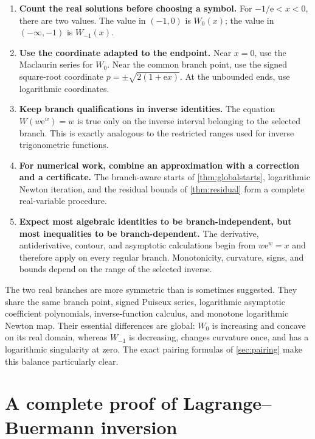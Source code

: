 \documentclass[11pt]{article}
\theoremstyle{remark}
\newcommand{\ee}{\mathrm e}
\begin{document}
\begin{enumerate}[label=\textbf{Step \arabic*.},leftmargin=*]
\item \textbf{Count the real solutions before choosing a symbol.}
For \(-1/\ee<x<0\), there are two values.  The value in \((-1,0)\) is
\(W_0(x)\); the value in \(( -\infty,-1)\) is \(W_{-1}(x)\).

\item \textbf{Use the coordinate adapted to the endpoint.}
Near \(x=0\), use the Maclaurin series for \(W_0\).  Near the common branch
point, use the signed square-root coordinate
\(p=\pm\sqrt{2(1+\ee x)}\).  At the unbounded ends, use logarithmic
coordinates.

\item \textbf{Keep branch qualifications in inverse identities.}
The equation \(W(w\ee^w)=w\) is true only on the inverse interval belonging
to the selected branch.  This is exactly analogous to the restricted ranges
used for inverse trigonometric functions.

\item \textbf{For numerical work, combine an approximation with a
correction and a certificate.}
The branch-aware starts of \cref{thm:globalstarts}, logarithmic Newton
iteration, and the residual bounds of \cref{thm:residual} form a complete
real-variable procedure.

\item \textbf{Expect most algebraic identities to be branch-independent,
but most inequalities to be branch-dependent.}
The derivative, antiderivative, contour, and asymptotic calculations begin
from \(w\ee^w=x\) and therefore apply on every regular branch.  Monotonicity,
curvature, signs, and bounds depend on the range of the selected inverse.
\end{enumerate}

The two real branches are more symmetric than is sometimes suggested.
They share the same branch point, signed Puiseux series, logarithmic
asymptotic coefficient polynomials, inverse-function calculus, and monotone
logarithmic Newton map.  Their essential differences are global: \(W_0\) is
increasing and concave on its real domain, whereas \(W_{-1}\) is decreasing,
changes curvature once, and has a logarithmic singularity at zero.  The exact
pairing formulas of \cref{sec:pairing} make this balance particularly clear.

\clearpage
\appendix

\section{A complete proof of Lagrange--Buer\-mann inversion}
\label{app:lagrange}
\end{document}
